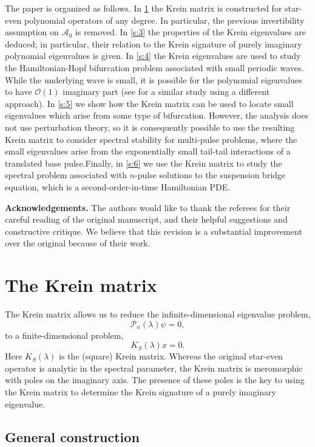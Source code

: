 \documentclass[review,onefignum,onetabnum]{siamart171218}
\newcommand{\calA}{\mathcal{A}}
\newcommand{\calO}{\mathcal{O}}
\newcommand{\calP}{\mathcal{P}}
\newcommand{\vK}{\bm{\mathit{K}}}
\newcommand{\vx}{\bm{\mathit{x}}}
\newcommand{\vn}{\bm{\mathit{0}}}
\begin{document}
The paper is organized as follows. In \cref{s:2} the Krein matrix is constructed for star-even polynomial operators of any degree. In particular, the previous invertibility assumption on $\calA_0$ is removed.
In \cref{s:3} the properties of the Krein eigenvalues are deduced; in particular, their relation to the Krein signature of purely imaginary polynomial eigenvalues is given. In \cref{s:4} the Krein eigenvalues are used to study the Hamiltonian-Hopf bifurcation problem associated with small periodic waves. While the underlying wave is small, it is possible for the polynomial eigenvalues to have $\calO(1)$ imaginary part (see \cite{deconinck:hfi16,kollar:dco19,trichtchenko:sop18}
for a similar study using a different approach). In \cref{s:5} we show how the Krein matrix can be used to locate small eigenvalues which arise from some type of bifurcation. However, the analysis does not use perturbation theory, so it is consequently possible to use the resulting Krein matrix to consider spectral stability for multi-pulse problems, where the small eigenvalues arise from the exponentially small tail-tail interactions of a translated base pulse.Finally, in \cref{s:6} we use the Krein matrix to study the spectral problem associated with $n$-pulse solutions to the suspension bridge equation, which is a second-order-in-time Hamiltonian PDE.

\vspace{1mm}
\noindent\textbf{Acknowledgements.} The authors would like to thank the referees for their careful reading of the original manuscript, and their helpful suggestions and constructive critique. We believe that this revision is a substantial improvement over the original because of their work.

\section{The Krein matrix}\label{s:2}

The Krein matrix allows us to reduce the infinite-dimensional eigenvalue problem,
\[
\calP_n(\lambda)\psi=0,
\]
to a finite-dimensional problem,
\[
\vK_S(\lambda)\vx=\vn.
\]
Here $\vK_S(\lambda)$ is the (square) Krein matrix. Whereas the original star-even operator is analytic in the spectral parameter, the Krein matrix is meromorphic with poles on the imaginary axis. The presence of these poles is the key to using the Krein matrix to determine the Krein signature of a purely imaginary eigenvalue.

\subsection{General construction}\label{s:21}
\end{document}
